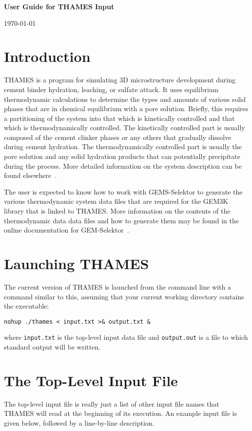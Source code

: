\documentclass{article}
\begin{document}
\begin{center}
\Large{\textbf{\textsf{User Guide for THAMES Input}}}
\end{center}
\begin{center}
\today
\end{center}

\vspace{0.25truein}
\section{Introduction}
THAMES is a program for simulating 3D microstructure development during cement
binder hydration, leaching, or sulfate attack.  It uses equilibrium
thermodynamic calculations to determine the types and amounts of various solid
phases that are in chemical equilibrium with a pore solution.  Briefly, this
requires a partitioning of the system into that which is kinetically controlled
and that which is thermodynamically controlled.  The kinetically controlled part
is usually composed of the cement clinker phases or any others that gradually
dissolve during cement hydration.  The thermodynamically controlled part is
usually the pore solution and any solid hydration products that can potentially
precipitate during the process.  More detailed information on the system
description can be found elsewhere~\cite{Bullard11a}.

The user is expected to know how to work with GEMS-Selektor to generate the
various thermodynamic system data files that are required for the GEM3K library
that is linked to THAMES.  More information on the contents of the thermodynamic data
data files and how to generate them may be found in the online documentation for
GEM-Selektor~\cite{Kulik13}.

\section{Launching THAMES}
The current version of THAMES is launched from the command line with a command
similar to this, assuming that your current working directory contains the
executable:
\lstset{language=bash}
\begin{lstlisting}
nohup ./thames < input.txt >& output.txt &
\end{lstlisting}
where \texttt{input.txt} is the top-level input data file and \texttt{output.out} is a file
to which standard output will be written.

\section{The Top-Level Input File}
The top-level input file is really just a list of other input file names that
THAMES will read at the beginning of its execution.  An example input file is
given below, followed by a line-by-line description.
\end{document}
